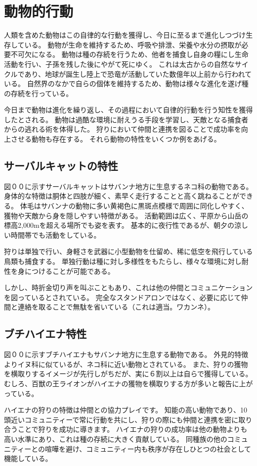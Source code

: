 \section{動物的行動}
人類を含めた動物はこの自律的な行動を獲得し、今日に至るまで進化しつづけ生存している。
動物が生命を維持するため、呼吸や排泄、栄養や水分の摂取が必要不可欠になる。
動物は種の存続を行うため、他者を捕食し自身の糧にし生命活動を行い、子孫を残した後にやがて死にゆく。
これは太古からの自然なサイクルであり、地球が誕生し陸上で恐竜が活動していた数億年以上前から行われている。
自然界のなかで自らの個体を維持するため、動物は様々な進化を遂げ種の存続を行っている。
\par 今日まで動物は進化を繰り返し、その過程において自律的行動を行う知性を獲得したとされる。
動物は過酷な環境に耐えうる手段を学習し、天敵となる捕食者からの逃れる術を体得した。
狩りにおいて仲間と連携を図ることで成功率を向上させる動物も存在する。
それら動物の特性をいくつか例をあげる。
\subsection{サーバルキャットの特性}
図００に示すサーバルキャットはサバンナ地方に生息するネコ科の動物である。
身体的な特徴は胴体と四肢が細く、素早く走行することと高く跳ねることができる。
体毛はサバンナの動物に多い黄褐色に黒斑点模様で周囲に同化しやすく、獲物や天敵から身を隠しやすい特徴がある。
活動範囲は広く、平原から山岳の標高2,000mを超える場所でも姿を表す。
基本的に夜行性であるが、朝夕の涼しい時間帯でも活動をしている。
\par 狩りは単独で行い、身軽さを武器に小型動物を仕留め、稀に低空を飛行している鳥類も捕食する。
単独行動は種に対し多様性をもたらし、様々な環境に対し耐性を身につけることが可能である。
\par しかし、時折金切り声を叫ぶこともあり、これは他の仲間とコミュニケーションを図っているとされている。
完全なスタンドアロンではなく、必要に応じて仲間と連絡を取ることで無駄を省いている（これは適当。ワカンネ）。

\subsection{ブチハイエナ特性}
図００に示すブチハイエナもサバンナ地方に生息する動物である。
外見的特徴よりイヌ科に似ているが、ネコ科に近い動物とされている。
また、狩りの獲物を横取りするイメージが先行しがちだが、実に６割以上は自らで獲得している。
むしろ、百獣の王ライオンがハイエナの獲物を横取りする方が多いと報告に上がっている。
\par ハイエナの狩りの特徴は仲間との協力プレイです。
知能の高い動物であり、10頭近いコミュニティーで常に行動を共にし、狩りの際にも仲間と連携を密に取り合うことで狩りを成功に導きます。
ハイエナの狩りの成功率は他の動物よりも高い水準にあり、これは種の存続に大きく貢献している。
同種族の他のコミュニティーとの喧嘩を避け、コミュニティー内も秩序が存在しひとつの社会として機能している。

